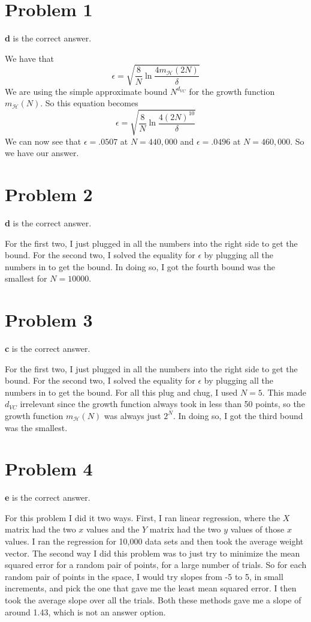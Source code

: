 \documentclass{article}
\begin{document}
\section*{Problem 1}
\textbf{d} is the correct answer.

\noindent We have that
\[ \epsilon = \sqrt{\frac{8}{N} \ln
        \frac{4m_{\mathcal{H}}(2N)}{\delta}} \]
We are using the simple approximate bound $N^{d_{VC}}$ for the growth function
$m_{\mathcal{H}}(N)$. So this equation becomes
\[ \epsilon = \sqrt{\frac{8}{N} \ln
        \frac{4(2N)^{10}}{\delta}} \]
We can now see that $\epsilon = .0507$ at $N = 440,000$ and $\epsilon = .0496$
at $N = 460,000$. So we have our answer.

\section*{Problem 2}
\textbf{d} is the correct answer.

\noindent For the first two, I just plugged in all the numbers into the right
side to get the bound. For the second two, I solved the equality for $\epsilon$
by plugging all the numbers in to get the bound. In doing so, I got the fourth
bound was the smallest for $N=10000$.

\section*{Problem 3}
\textbf{c} is the correct answer.

\noindent For the first two, I just plugged in all the numbers into the right
side to get the bound. For the second two, I solved the equality for $\epsilon$
by plugging all the numbers in to get the bound. For all this plug and chug,
I used $N=5$. This made $d_{VC}$ irrelevant since the growth function always
took in less than 50 points, so the growth function $m_{\mathcal{H}}(N)$ was
always just $2^N$. In doing so, I got the third bound was the smallest.

\section*{Problem 4}
\textbf{e} is the correct answer.

\noindent For this problem I did it two ways. First, I ran linear regression,
where the $X$ matrix had the two $x$ values and the $Y$ matrix had the two
$y$ values of those $x$ values. I ran the regression for 10,000 data sets and then
took the average weight vector. The second way I did this problem was to just
try to minimize the mean squared error for a random pair of points, for a large
number of trials. So for each random pair of points in the space, I would try
slopes from -5 to 5, in small increments, and pick the one that gave me the
least mean squared error. I then took the average slope over all the trials.
Both these methods gave me a slope of around 1.43, which is not an answer option.
\end{document}
